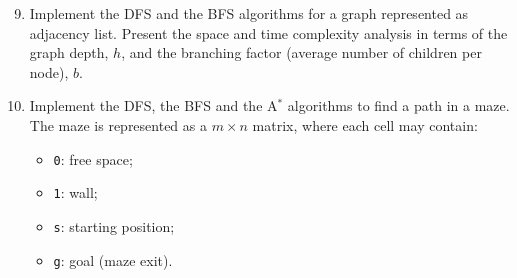 \documentclass{article}
\begin{document}
\begin{enumerate}
    \setcounter{enumi}{8}
    \item Implement the DFS and the BFS algorithms for a graph represented as adjacency list. Present the space and time complexity analysis in terms of the graph depth, $h$, and the branching factor (average number of children per node), $b$.
    \item Implement the DFS, the BFS and the A$^*$ algorithms to find a path in a maze.
    The maze is represented as a $m \times n$ matrix, where each cell may contain:

    \begin{itemize}
        \item \texttt{0}: free space;
        \item \texttt{1}: wall;
        \item \texttt{s}: starting position;
        \item \texttt{g}: goal (maze exit).
    \end{itemize}
\end{enumerate}
\end{document}
